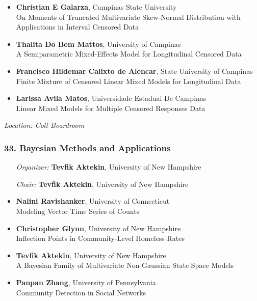 \begin{itemize}
\item \textbf{Christian E Galarza}, Campinas State University \\
On Moments of Truncated Multivariate Skew-Normal Distribution with Applications in Interval Censored Data
\item \textbf{Thalita Do Bem Mattos}, University of Campinas \\
A Semiparametric Mixed-Effects Model for Longitudinal  Censored Data
\item \textbf{Francisco Hildemar Calixto de Alencar}, State University of Campinas \\
Finite Mixture of Censored Linear Mixed Models for Longitudinal Data
\item \textbf{Larissa Avila Matos}, Universidade Estadual De Campinas \\
Linear Mixed Models for Multiple Censored Responses Data
\end{itemize}

\emph{Location: Colt Boardroom}

\subsubsection*{33. Bayesian Methods and Applications}

\begin{enumerate}[align=left]
\item [\emph{Organizer:}] \textbf{Tevfik Aktekin}, University of New Hampshire
\item [\emph{Chair:}] \textbf{Tevfik Aktekin}, University of New Hampshire
\end{enumerate}

\begin{itemize}
\item \textbf{Nalini Ravishanker}, University of Connecticut \\
Modeling Vector Time Series of Counts
\item \textbf{Christopher Glynn}, University of New Hampshire \\
Inflection Points in Community-Level Homeless Rates
\item \textbf{Tevfik Aktekin}, University of New Hampshire \\
A Bayesian Family of Multivariate Non-Gaussian State Space Models
\item \textbf{Panpan Zhang}, University of Pennsylvania \\
Community Detection in Social Networks
\end{itemize}

